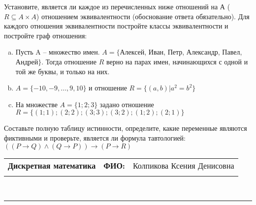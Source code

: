 \documentclass[10pt]{exam}
\newcommand{\class}{Дискретная математика}
\newcommand{\examdate}{}
\begin{document}
\begin{questions}
\question
Установите, является ли каждое из перечисленных ниже отношений на А ($R \subseteq A \times A$) отношением эквивалентности (обоснование ответа обязательно). Для каждого отношения эквивалентности постройте классы 
эквивалентности и постройте граф отношения:
\begin{enumerate} [a)]\setcounter{enumi}{0}
\item Пусть A – множество имен. $A = \{ $Алексей, Иван, Петр, Александр, Павел, Андрей$ \}$. Тогда отношение $R$ верно на парах имен, начинающихся с одной и той же буквы, и только на них.
\item $A = \{-10, -9, … , 9, 10\}$ и отношение $ R = \{(a,b)|a^{2} = b^{2}\}$
\item На множестве $A = \{1; 2; 3\}$ задано отношение $R = \{(1; 1); (2; 2); (3; 3); (3; 2); (1; 2); (2; 1)\}$
\end{enumerate}\question Составьте полную таблицу истинности, определите, какие переменные являются фиктивными и проверьте, является ли формула тавтологией:
$(( P \rightarrow Q) \land (Q \rightarrow P)) \rightarrow (P \rightarrow R)$

\end{questions}
\newpage
\begin{flushright}
\begin{tabular}{p{2.8in} r l}
\textbf{\class} & \textbf{ФИО:} &Колпикова Ксения Денисовна
\\

\textbf{\examdate} &&\\
\end{tabular}\\
\end{flushright}
\rule[1ex]{\textwidth}{.1pt}
\end{document}
